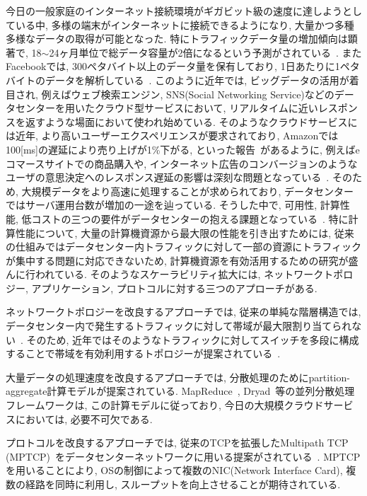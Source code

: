 \documentclass[11pt, a4paper, twocolumn]{jsarticle}
\begin{document}
今日の一般家庭のインターネット接続環境がギガビット級の速度に達しようとしている中, 多様の端末がインターネットに接続できるようになり,
大量かつ多種多様なデータの取得が可能となった.
特にトラフィックデータ量の増加傾向は顕著で, 18$\sim$24ヶ月単位で総データ容量が2倍になるという予測がされている~\cite{IBM_rep}.
またFacebookでは, 300ペタバイト以上のデータ量を保有しており, 1日あたりに1ペタバイトのデータを解析している~\cite{presto}.
このように近年では, ビッグデータの活用が着目され, 例えばウェブ検索エンジン, SNS(Social Networking Service)などのデータセンターを用いたクラウド型サービスにおいて, リアルタイムに近いレスポンスを返すような場面において使われ始めている.
そのようなクラウドサービスには近年, より高いユーザーエクスペリエンスが要求されており,
Amazonでは100[ms]の遅延により売り上げが1\%下がる, といった報告~\cite{amazon}があるように,
例えばeコマースサイトでの商品購入や,
インターネット広告のコンバージョンのようなユーザの意思決定へのレスポンス遅延の影響は深刻な問題となっている~\cite{customer_impact}.
そのため, 大規模データをより高速に処理することが求められており, データセンターではサーバ運用台数が増加の一途を辿っている.
そうした中で, 可用性, 計算性能, 低コストの三つの要件がデータセンターの抱える課題となっている~\cite{requirement}.
特に計算性能について, 大量の計算機資源から最大限の性能を引き出すためには,
従来の仕組みではデータセンター内トラフィックに対して一部の資源にトラフィックが集中する問題に対応できないため,
計算機資源を有効活用するための研究が盛んに行われている\cite{mapreduce, dryad, fattree, bcube, vl2,
dctcp, improving, detail, p_fab}.
そのようなスケーラビリティ拡大には, ネットワークトポロジー, アプリケーション, プロトコルに対する三つのアプローチがある.

ネットワークトポロジーを改良するアプローチでは, 従来の単純な階層構造では,
データセンター内で発生するトラフィックに対して帯域が最大限割り当てられない~\cite{fattree}.
そのため, 近年ではそのようなトラフィックに対してスイッチを多段に構成することで帯域を有効利用するトポロジーが提案されている~\cite{fattree,
bcube, vl2}.

大量データの処理速度を改良するアプローチでは,
分散処理のためにpartition-aggregate計算モデルが提案されている.
MapReduce~\cite{mapreduce}, Dryad~\cite{dryad}等の並列分散処理フレームワークは,
この計算モデルに従っており, 今日の大規模クラウドサービスにおいては, 必要不可欠である.

プロトコルを改良するアプローチでは,
従来のTCPを拡張したMultipath TCP
(MPTCP)~\cite{mptcp}をデータセンターネットワークに用いる提案がされている~\cite{fattree,bcube,vl2}.
MPTCPを用いることにより, OSの制御によって複数のNIC(Network Interface Card), 複数の経路を同時に利用し,
スループットを向上させることが期待されている.
\end{document}
